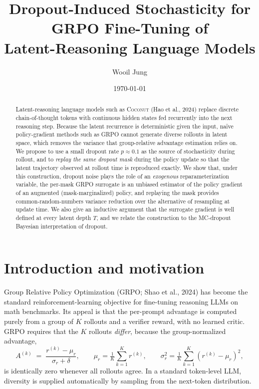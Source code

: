 \documentclass[11pt]{article}
\title{Dropout-Induced Stochasticity for GRPO Fine-Tuning of \\
       Latent-Reasoning Language Models}
\author{Wooil Jung}
\date{\today}
\theoremstyle{definition}
\theoremstyle{remark}
\begin{document}
\maketitle

\begin{abstract}
Latent-reasoning language models such as \textsc{Coconut} (Hao et al., 2024)
replace discrete chain-of-thought tokens with continuous hidden states fed
recurrently into the next reasoning step.  Because the latent recurrence is
deterministic given the input, na\"ive policy-gradient methods such as GRPO
cannot generate diverse rollouts in latent space, which removes the variance
that group-relative advantage estimation relies on.  We propose to use a small
dropout rate $p \approx 0.1$ as the source of stochasticity during rollout, and
to \emph{replay the same dropout mask} during the policy update so that the
latent trajectory observed at rollout time is reproduced exactly.  We show
that, under this construction, dropout noise plays the role of an
\emph{exogenous} reparameterization variable, the per-mask GRPO surrogate is an
unbiased estimator of the policy gradient of an augmented (mask-marginalized)
policy, and replaying the mask provides common-random-numbers variance
reduction over the alternative of resampling at update time.  We also give an
inductive argument that the surrogate gradient is well defined at every latent
depth $T$, and we relate the construction to the MC-dropout Bayesian
interpretation of dropout.
\end{abstract}

\section{Introduction and motivation}

Group Relative Policy Optimization (GRPO; Shao et al., 2024) has become the
standard reinforcement-learning objective for fine-tuning reasoning LLMs on
math benchmarks.  Its appeal is that the per-prompt advantage is computed
purely from a group of $K$ rollouts and a verifier reward, with no learned
critic.  GRPO requires that the $K$ rollouts \emph{differ}, because the
group-normalized advantage,
\begin{equation}
A^{(k)} \;=\; \frac{r^{(k)} - \mu_r}{\sigma_r + \delta},
\qquad
\mu_r = \tfrac1K\sum_{k=1}^{K} r^{(k)},
\qquad
\sigma_r^2 = \tfrac1K\sum_{k=1}^{K}(r^{(k)} - \mu_r)^2,
\label{eq:grpo-advantage}
\end{equation}
is identically zero whenever all rollouts agree.  In a standard token-level
LLM, diversity is supplied automatically by sampling from the next-token
distribution.
\end{document}
